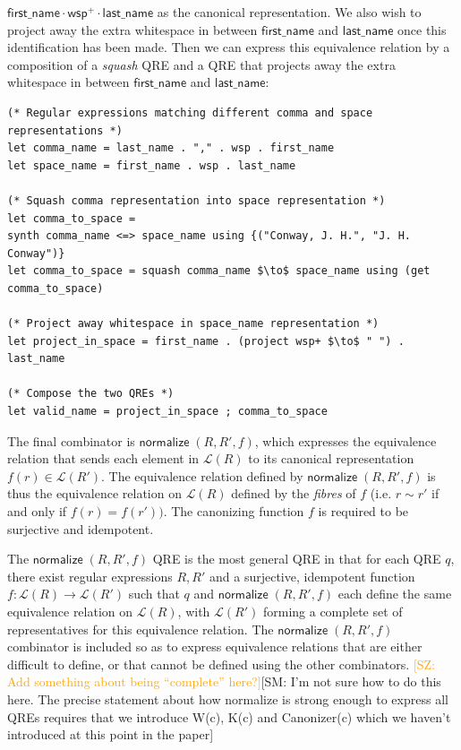\documentclass[acmsmall,review,anonymous]{acmart}\settopmatter{printfolios=true,printccs=false,printacmref=false}
\newcommand{\FINISH}[3]{\ifdraft\textcolor{#1}{[#2: #3]}\fi}
\newcommand{\saz}[1]{\FINISH{orange}{SZ}{#1}}
\newcommand{\sam}[1]{\FINISH{dkpurple}{SM}{#1}}
\newcommand{\kw}[1]{\ensuremath{\mathsf{#1}}}
\newcommand{\normalize}[3]{\ensuremath{\kw{normalize} \; (#1, #2, #3)}}
\begin{document}
\noindent $\kw{first\_name\cdot wsp^+ \cdot last\_name}$ as the canonical
representation. We also wish to project away the extra whitespace in between
\kw{first\_name} and \kw{last\_name} once this identification has been made.
Then we can express this equivalence relation by a composition of a
\textit{squash} QRE and a QRE that projects away the extra whitespace in between
\kw{first\_name} and \kw{last\_name}:


\begin{lstlisting}
(* Regular expressions matching different comma and space representations *)
let comma_name = last_name . "," . wsp . first_name
let space_name = first_name . wsp . last_name

(* Squash comma representation into space representation *)
let comma_to_space =
synth comma_name <=> space_name using {("Conway, J. H.", "J. H. Conway")}
let comma_to_space = squash comma_name $\to$ space_name using (get comma_to_space)

(* Project away whitespace in space_name representation *)
let project_in_space = first_name . (project wsp+ $\to$ " ") . last_name

(* Compose the two QREs *)
let valid_name = project_in_space ; comma_to_space
\end{lstlisting}

The final combinator is $\normalize{R}{R'}{f}$, which expresses
the equivalence relation that sends each element in $\mathcal{L}(R)$ to its
canonical representation $f(r) \in \mathcal{L}(R')$. The equivalence relation
defined by $\normalize{R}{R'}{f}$ is thus the equivalence relation on
$\mathcal{L}(R)$ defined by the {\em fibres} of $f$ (i.e. $r \sim r'$ if and
only if $f(r) = f(r'))$. The canonizing function $f$ is required to be
surjective and idempotent.

The $\normalize{R}{R'}{f}$ QRE is the most general QRE in that for each QRE
$q$, there exist regular expressions $R, R'$ and a surjective, idempotent
function $f:\mathcal{L}(R) \longrightarrow \mathcal{L}(R')$ such that $q$ and
$\normalize{R}{R'}{f}$ each define the same equivalence relation on
$\mathcal{L}(R)$, with $\mathcal{L}(R')$ forming a complete set of
representatives for this equivalence relation. The $\normalize{R}{R'}{f}$
combinator is included so as to express equivalence relations that are either
difficult to define, or that cannot be defined using the other combinators.
\saz{Add something about being ``complete'' here?}\sam{I'm not sure how to do
this here. The precise statement about how normalize is strong enough to
express all QREs requires that we introduce W(c), K(c) and Canonizer(c) which
we haven't introduced at this point in the paper}
\end{document}
